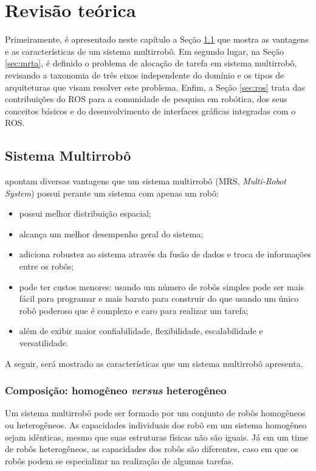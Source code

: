 \chapter[Revisão teórica]{Revisão teórica} \label{cap:revisao}
    Primeiramente, é apresentado neste capítulo a Seção \ref{sec:mrs} que mostra as vantagens e as características de um sistema multirrobô. Em segundo lugar, na Seção \ref{sec:mrta}, é definido o problema de alocação de tarefa em sistema multirrobô, revisando a taxonomia de três eixos independente do domínio e os tipos de arquiteturas que visam resolver este problema. Enfim, a Seção \ref{sec:ros} trata das contribuições do ROS para a comunidade de pesquisa em robótica, dos seus conceitos básicos e do desenvolvimento de interfaces gráficas integradas com o ROS.
    
    \section{Sistema Multirrobô} \label{sec:mrs}
         apontam diversas vantagens que um sistema multirrobô (MRS, \textit{Multi-Robot System}) possui perante um sistema com apenas um robô:
        
        \begin{itemize}
            \item possui melhor distribuição espacial;
            \item alcança um melhor desempenho geral do sistema;
            \item adiciona robustez ao sistema através da fusão de dados e troca de informações entre os robôs;
            \item pode ter custos menores: usando um número de robôs simples pode ser mais fácil para programar e mais barato para construir do que usando um único robô poderoso que é complexo e caro para realizar um tarefa;
            \item além de exibir maior confiabilidade, flexibilidade, escalabilidade e versatilidade.
        \end{itemize}
        
        A seguir, será mostrado as características que um sistema multirrobô apresenta.
        
        \subsection{Composição: homogêneo \textit{versus} heterogêneo}
            Um sistema multirrobô pode ser formado por um conjunto de robôs homogêneos ou heterogêneos. As capacidades individuais dos robô em um sistema homogêneo sejam idênticas, mesmo que suas estruturas físicas não são iguais. Já em um time de robôs heterogêneos, as capacidades dos robôs são diferentes, caso em que os robôs podem se especializar na realização de algumas tarefas. %
        
